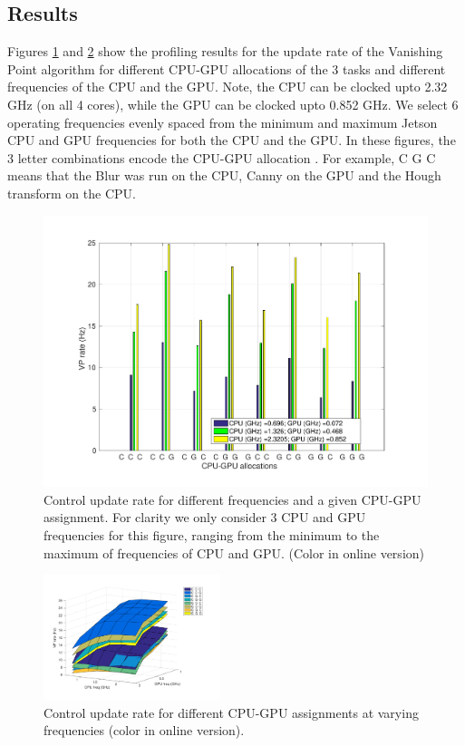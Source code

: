 \subsection{Results}

Figures \ref{fig:dfsa} and \ref{fig:sfda} show the profiling results for the update rate of the Vanishing Point algorithm for different CPU-GPU allocations of the 3 tasks and different frequencies of the CPU and the GPU. 
Note, the CPU can be clocked upto 2.32 GHz (on all 4 cores), while the GPU can be clocked upto 0.852 GHz. 
We select 6 operating frequencies evenly spaced from the minimum and maximum Jetson CPU and GPU frequencies for both the CPU and the GPU. 
In these figures, the 3 letter combinations encode the CPU-GPU allocation .
For example, C G C means that the Blur was run on the CPU, Canny on the GPU and the Hough transform on the CPU.


\begin{figure}[hbtp]
\centering
\includegraphics[scale=0.3]{Data/figs/RateHist.pdf}
\caption{Control update rate for different frequencies and a given CPU-GPU assignment. For clarity we only consider 3 CPU and GPU frequencies for this figure, ranging from the minimum to the maximum of frequencies of CPU and GPU. (Color in online version) }
\label{fig:dfsa} %
\end{figure}

\begin{figure}[htbp]
	\centering
	\includegraphics[width=0.46\textwidth]{Data/figs/surf_Rate.pdf}
	\caption{Control update rate for different CPU-GPU assignments at varying frequencies (color in online version).}
	\label{fig:sfda}%
\end{figure}

